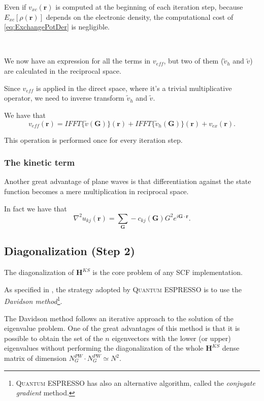 \documentclass[a4paper,12pt]{article}
\newcommand\mf[1]{\mathbf{#1}}
\newcommand\dens{\rho(\mathbf{r})}
\newcommand\erre{\mathbf{r}}
\newcommand\GI{\mathbf{G}}
\newcommand\QE{\textsc{Quantum} ESPRESSO }
\begin{document}
Even if $v_{xc}(\erre)$ is computed at the beginning of each iteration step, because $E_{xc}[\dens]$ depends on the electronic density, the computational cost of \eqref{eq:ExchangePotDer} is negligible.


~


We now have an expression for all the terms in $v_{eff}$, but two of them ($\tilde{v}_{h}$ and $\tilde{v}$) are calculated in the reciprocal space.

Since $v_{eff}$ is applied in the direct space, where it's a trivial multiplicative operator, we need to inverse transform $\tilde{v}_{h}$ and $\tilde{v}$.

We have that
\begin{equation}
	v_{eff}(\erre) = IFFT\{\tilde{v}(\mf{G})\}(\erre) + IFFT\{\tilde{v}_{h}(\mf{G})\}(\erre) + v_{ex}(\erre).
\end{equation}

This operation is performed once for every iteration step.

\subsubsection{The kinetic term}\label{sec:KineticTerm}

Another great advantage of plane waves is that differentiation against the state function becomes a mere multiplication in reciprocal space.

In fact we have that 
\begin{equation}
	\nabla^2 u_{kj}(\erre) = \sum_{\mf{G}} - c_{kj}(\mf{G})  G^2  e^{i \GI  \cdot \erre}.
\end{equation}


\subsection{Diagonalization (Step 2)}
The diagonalization of $\mf{H}^{KS}$ is the core problem of any SCF implementation.

As specified in \cite[Appendix A.2]{QE}, the strategy adopted by \QE is to use the \textit{Davidson method}\cite{Davidson}\footnote{\QE has also an alternative algorithm, called the \textit{conjugate gradient} method.}.

The Davidson method follows an iterative approach to the solution of the eigenvalue problem.
One of the great advantages of this method is that it is possible to obtain the set of the $n$ eigenvectors with the lower (or upper) eigenvalues without performing the diagonalization of the whole $\mf{H}^{KS}$ dense matrix of dimension $N_{G}^{PW} \cdot N_{G}^{PW} \simeq N^2$.
\end{document}

